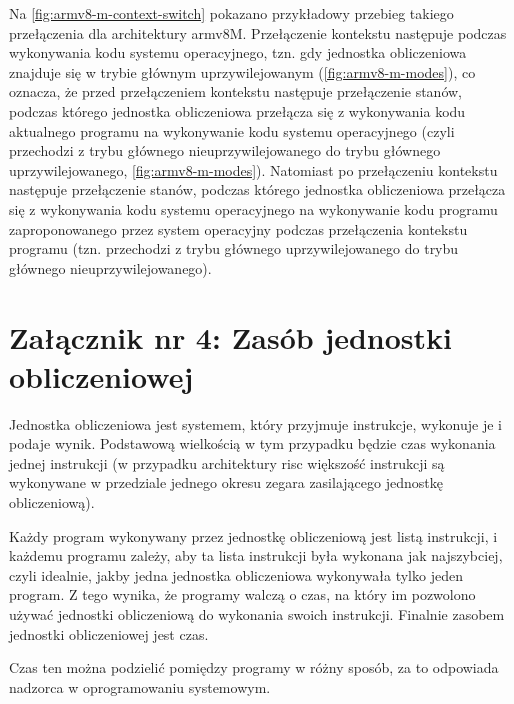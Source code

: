 \documentclass[../main]{subfiles}
\begin{document}
Na \cref{fig:armv8-m-context-switch} pokazano przykładowy przebieg takiego przełączenia dla architektury \gls{arm}v8M. Przełączenie kontekstu następuje podczas wykonywania kodu systemu operacyjnego, tzn. gdy jednostka obliczeniowa znajduje się w trybie głównym uprzywilejowanym (\cref{fig:armv8-m-modes}), co oznacza, że przed przełączeniem kontekstu następuje przełączenie stanów, podczas którego jednostka obliczeniowa przełącza się z wykonywania kodu aktualnego programu na wykonywanie kodu systemu operacyjnego (czyli przechodzi z trybu głównego nieuprzywilejowanego do trybu głównego uprzywilejowanego, \cref{fig:armv8-m-modes}). Natomiast po przełączeniu kontekstu następuje przełączenie stanów, podczas którego jednostka obliczeniowa przełącza się z wykonywania kodu systemu operacyjnego na wykonywanie kodu programu zaproponowanego przez system operacyjny podczas przełączenia kontekstu programu (tzn. przechodzi z trybu głównego uprzywilejowanego do trybu głównego nieuprzywilejowanego).

\section*{Załącznik nr 4: Zasób jednostki obliczeniowej}\label{sec:zalacznik-4}

Jednostka obliczeniowa jest systemem, który przyjmuje instrukcje, wykonuje je i podaje wynik. Podstawową wielkością w tym przypadku będzie czas wykonania jednej instrukcji (w przypadku architektury \gls{risc} większość instrukcji są wykonywane w przedziale jednego okresu zegara zasilającego jednostkę obliczeniową).

Każdy program wykonywany przez jednostkę obliczeniową jest listą instrukcji, i każdemu programu zależy, aby ta lista instrukcji była wykonana jak najszybciej, czyli idealnie, jakby jedna jednostka obliczeniowa wykonywała tylko jeden program. Z tego wynika, że programy walczą o czas, na który im pozwolono używać jednostki obliczeniową do wykonania swoich instrukcji. Finalnie zasobem jednostki obliczeniowej jest czas.

Czas ten można podzielić pomiędzy programy w różny sposób, za to odpowiada nadzorca w oprogramowaniu systemowym.
\end{document}
